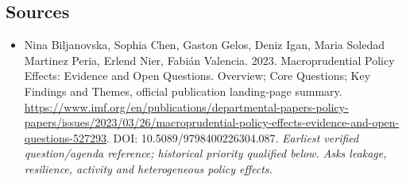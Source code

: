 \documentclass[11pt]{article}
\begin{document}
\subsection{Sources}
\begin{itemize}\raggedright
\item[\textnormal{[S1]}]\hypertarget{source:30007606:1}{} Nina Biljanovska, Sophia Chen, Gaston Gelos, Deniz Igan, Maria Soledad Martinez Peria, Erlend Nier, Fabián Valencia. 2023. Macroprudential Policy Effects: Evidence and Open Questions. Overview; Core Questions; Key Findings and Themes, official publication landing-page summary.
\url{https://www.imf.org/en/publications/departmental-papers-policy-papers/issues/2023/03/26/macroprudential-policy-effects-evidence-and-open-questions-527293}.
DOI: 10.5089/9798400226304.087.
{\small\textit{Earliest verified question/agenda reference; historical priority qualified below. Asks leakage, resilience, activity and heterogeneous policy effects.}}
\end{itemize}
\end{document}

